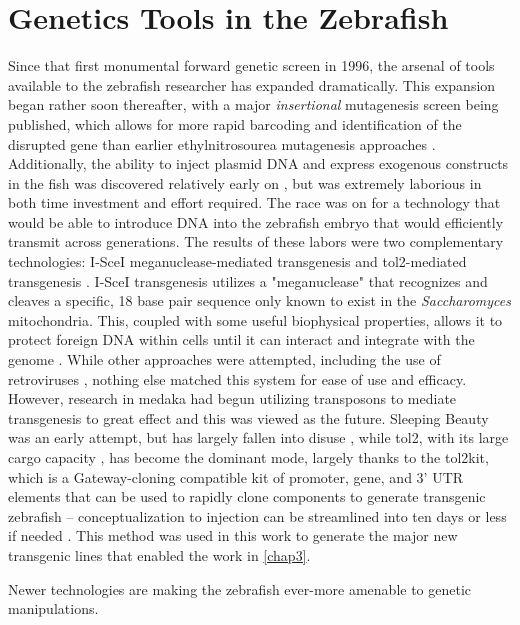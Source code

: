\section{Genetics Tools in the Zebrafish}

Since that first monumental forward genetic screen in 1996, the arsenal of tools available to the zebrafish researcher has expanded dramatically. This expansion began rather soon thereafter, with a major \textit{insertional} mutagenesis screen being published, which allows for more rapid barcoding and identification of the disrupted gene than earlier ethylnitrosourea mutagenesis approaches \citep{Amsterdam1999}. Additionally, the ability to inject plasmid DNA and express exogenous constructs in the fish was discovered relatively early on \citep{Stuart1988, Lele1996}, but was extremely laborious in both time investment and effort required. The race was on for a technology that would be able to introduce DNA into the zebrafish embryo that would efficiently transmit across generations. The results of these labors were two complementary technologies: I-SceI meganuclease-mediated transgenesis \citep{Thermes2002} and tol2-mediated transgenesis \citep{Kwan2007}. I-SceI transgenesis utilizes a "meganuclease" that recognizes and cleaves a specific, 18 base pair sequence only known to exist in the \textit{Saccharomyces} mitochondria. This, coupled with some useful biophysical properties, allows it to protect foreign DNA within cells until it can interact and integrate with the genome \citep{Soroldoni2009, Grabher2004}. While other approaches were attempted, including the use of retroviruses \citep{Kurita2004}, nothing else matched this system for ease of use and efficacy. However, research in medaka had begun utilizing transposons to mediate transgenesis to great effect and this was viewed as the future. Sleeping Beauty was an early attempt, but has largely fallen into disuse \citep{Davidson2003}, while tol2, with its large cargo capacity \citep{Balciunas2006}, has become the dominant mode, largely thanks to the tol2kit, which is a Gateway-cloning compatible kit of promoter, gene, and 3' UTR elements that can be used to rapidly clone components to generate transgenic zebrafish -- conceptualization to injection can be streamlined into ten days or less if needed \citep{Kwan2007}. This method was used in this work to generate the major new transgenic lines that enabled the work in \autoref{chap3}.

Newer technologies are making the zebrafish ever-more amenable to genetic manipulations.

